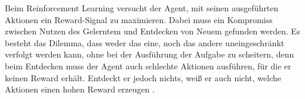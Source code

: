 Beim Reinforcement Learning versucht der Agent, mit seinen ausgeführten Aktionen ein Reward-Signal zu maximieren.
Dabei muss ein Kompromiss zwischen Nutzen des Gelerntem und Entdecken von Neuem gefunden werden.
Es besteht das Dilemma, dass weder das eine, noch das andere uneingeschränkt verfolgt werden kann, ohne bei der Ausführung der Aufgabe zu scheitern, denn beim Entdecken muss der Agent auch schlechte Aktionen ausführen, für die er keinen Reward erhält.
Entdeckt er jedoch nichts, weiß er auch nicht, welche Aktionen einen hohen Reward erzeugen \cite[3]{sutton2018rlintro}.

    
    
    
    
    
